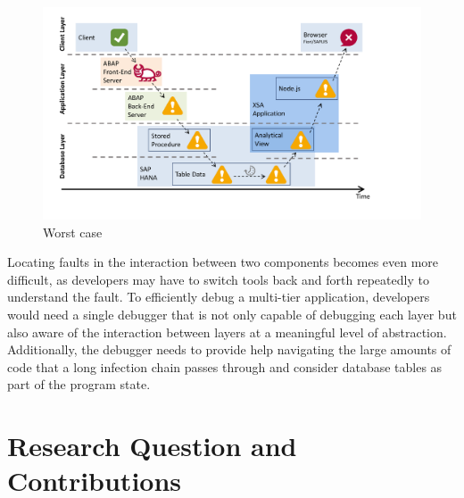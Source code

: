 \begin{figure}[t]
\centering
\includegraphics[width=.9\linewidth]{img/worstcase}
\caption{Worst case}
\label{fig:worstcase}
\end{figure}

Locating faults in the interaction between two components becomes even more difficult, as developers may have to switch tools back and forth repeatedly to understand the fault.
To efficiently debug a multi-tier application, developers would need a single debugger that is not only capable of debugging each layer but also aware of the interaction between layers at a meaningful level of abstraction.
Additionally, the debugger needs to provide help
navigating the large amounts of code that a long infection chain passes through
and consider database tables as part of the program state.



\section{Research Question and Contributions} %

